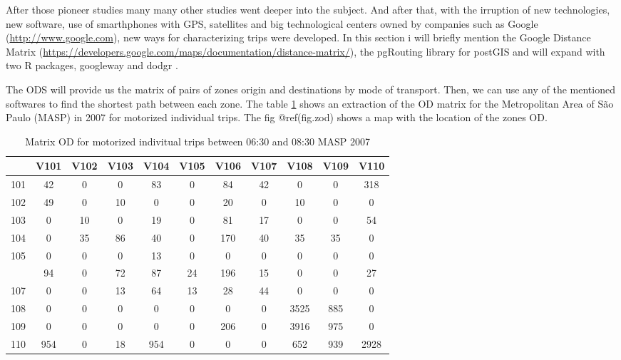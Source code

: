 \documentclass[12pt,graybox,envcountchap,sectrefs]{krantz}
\theoremstyle{definition}
\theoremstyle{definition}
\theoremstyle{definition}
\theoremstyle{remark}
\begin{document}
After those pioneer studies many many other studies went deeper into the
subject. And after that, with the irruption of new technologies, new
software, use of smarthphones with GPS, satellites and big technological
centers owned by companies such as Google (\url{http://www.google.com}),
new ways for characterizing trips were developed. In this section i will
briefly mention the Google Distance Matrix
(\url{https://developers.google.com/maps/documentation/distance-matrix/}),
the pgRouting library \citep{patrushev2007shortest} for postGIS and will
expand with two R packages, googleway \citep{googleway} and dodgr
\citep{dodgr}.

The ODS will provide us the matrix of pairs of zones origin and
destinations by mode of transport. Then, we can use any of the mentioned
softwares to find the shortest path between each zone. The table
\ref{tab:ods} shows an extraction of the OD matrix for the Metropolitan
Area of São Paulo (MASP) in 2007 for motorized individual trips. The fig
@ref(fig.zod) shows a map with the location of the zones OD.

\begin{table}

\caption{\label{tab:ods}Matrix OD for motorized indivitual trips between 06:30 and 08:30 MASP 2007}
\centering
\begin{tabular}[t]{lcccccccccc}
\toprule
  & V101 & V102 & V103 & V104 & V105 & V106 & V107 & V108 & V109 & V110\\
\midrule
101 & 42 & 0 & 0 & 83 & 0 & 84 & 42 & 0 & 0 & 318\\
102 & 49 & 0 & 10 & 0 & 0 & 20 & 0 & 10 & 0 & 0\\
103 & 0 & 10 & 0 & 19 & 0 & 81 & 17 & 0 & 0 & 54\\
104 & 0 & 35 & 86 & 40 & 0 & 170 & 40 & 35 & 35 & 0\\
105 & 0 & 0 & 0 & 13 & 0 & 0 & 0 & 0 & 0 & 0\\
\addlinespace
106 & 94 & 0 & 72 & 87 & 24 & 196 & 15 & 0 & 0 & 27\\
107 & 0 & 0 & 13 & 64 & 13 & 28 & 44 & 0 & 0 & 0\\
108 & 0 & 0 & 0 & 0 & 0 & 0 & 0 & 3525 & 885 & 0\\
109 & 0 & 0 & 0 & 0 & 0 & 206 & 0 & 3916 & 975 & 0\\
110 & 954 & 0 & 18 & 954 & 0 & 0 & 0 & 652 & 939 & 2928\\
\bottomrule
\end{tabular}
\end{table}
\end{document}
